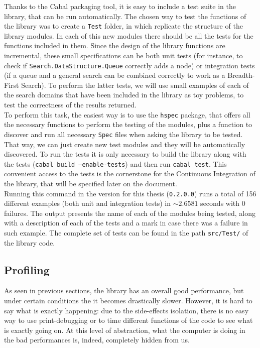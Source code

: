 Thanks to the Cabal packaging tool, it is easy to include a test suite in the
library, that can be run automatically. The chosen way to test the functions of
the library was to create a \texttt{Test} folder, in which replicate the
structure of the library modules. In each of this new modules there should be
all the tests for the functions included in them. Since the design of the
library functions are incremental, these small specifications can be both unit
tests (for instance, to check if \texttt{Search.DataStructure.Queue} correctly
adds a node) or integration tests (if a queue and a general search can be
combined correctly to work as a Breadth-First Search). To perform the latter
tests, we will use small examples of each of the search domains that have been
included in the library as toy problems, to test the correctness of the results
returned.\\

To perform this task, the easiest way is to use the \texttt{hspec} package,
that offers all the necessary functions to perform the testing of the modules,
plus a function to discover and run all necessary \texttt{Spec} files when
asking the library to be tested. That way, we can just create new test modules
and they will be automatically discovered. To run the tests it is only
necessary to build the library along with the tests (\texttt{cabal build
  --enable-tests}) and then run \texttt{cabal test}. This convenient access to
the tests is the cornerstone for the Continuous Integration of the library,
that will be specified later on the document.\\

Running this command in the version for this thesis (\texttt{0.2.0.0}) runs a
total of 156 different examples (both unit and integration tests) in
$\sim 2.6581$ seconds with 0 failures. The output presents the name of each of
the modules being tested, along with a description of each of the tests and a
mark in case there was a failure in such example. The complete set of tests can
be found in the path \texttt{src/Test/} of the library code.\\

\subsection{Profiling}

As seen in previous sections, the library has an overall good performance, but
under certain conditions the it becomes drastically slower. However, it is hard
to say what is exactly happening: due to the side-effects isolation, there is
no easy way to use print-debugging or to time different functions of the code
to see what is exactly going on. At this level of abstraction, what the
computer is doing in the bad performances is, indeed, completely hidden from
us.\\

